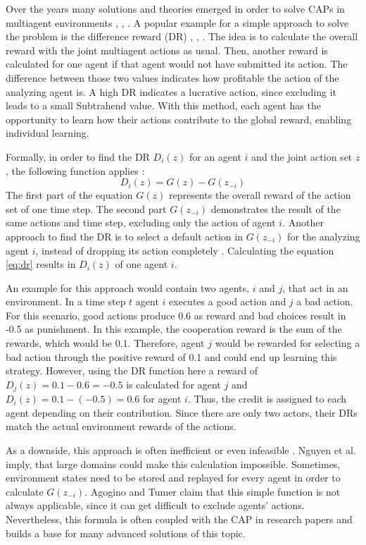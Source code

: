Over the years many solutions and theories emerged in order to solve CAPs in multiagent environments \cite{rabe09}, \cite{zhli20}, \cite{agtu04}. A popular example for a simple approach to solve the problem is the difference reward (DR) \cite{ngku18}, \cite{yltu14}, \cite{agtu04}. The idea is to calculate the overall reward with the joint multiagent actions as usual. Then, another reward is calculated for one agent if that agent would not have submitted its action. The difference between those two values indicates how profitable the action of the analyzing agent is. A high DR indicates a lucrative action, since excluding it leads to a small Subtrahend value. With this method, each agent has the opportunity to learn how their actions contribute to the global reward, enabling individual learning. 

Formally, in order to find the DR $D_i(z)$ for an agent $i$ and the joint action set $z$, the following function applies \cite{agtu04}:
\begin{equation}\label{eq:dr}
    D_i(z) = G(z) - G(z_{-i})
\end{equation}
The first part of the equation $G(z)$ represents the overall reward of the action set of one time step. The second part $G(z_{-i})$ demonstrates the result of the same actions and time step, excluding only the action of agent $i$. Another approach to find the DR is to select a default action in $G(z_{-i})$ for the analyzing agent $i$, instead of dropping its action completely \cite{vega96}. Calculating the equation \eqref{eq:dr} results in $D_i(z)$ of one agent $i$. 

An example for this approach would contain two agents, $i$ and $j$, that act in an environment. In a time step $t$ agent $i$ executes a good action and $j$ a bad action. For this scenario, good actions produce 0.6 as reward and bad choices result in -0.5 as punishment. In this example, the cooperation reward is the sum of the rewards, which would be 0.1. Therefore, agent $j$ would be rewarded for selecting a bad action through the positive reward of 0.1 and could end up learning this strategy. However, using the DR function here a reward of $D_j(z) = 0.1 - 0.6 = -0.5$ is calculated for agent $j$ and $D_i(z) = 0.1 - (-0.5) = 0.6$ for agent $i$. Thus, the credit is assigned to each agent depending on their contribution. Since there are only two actors, their DRs match the actual environment rewards of the actions.

As a downside, this approach is often inefficient or even infeasible \cite{ngku18}. Nguyen et al. \cite{ngku18} imply, that large domains could make this calculation impossible. Sometimes, environment states need to be stored and replayed for every agent in order to calculate $G(z_{-i})$. Agogino and Tumer \cite{agtu04} claim that this simple function is not always applicable, since it can get difficult to exclude agents' actions. Nevertheless, this formula is often coupled with the CAP in research papers and builds a base for many advanced solutions of this topic.

